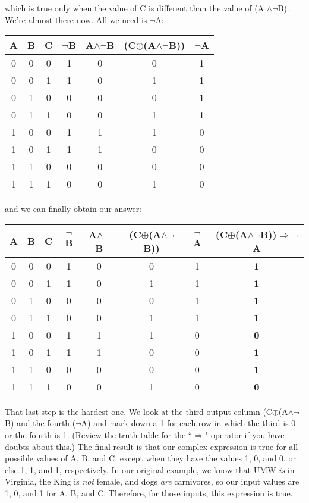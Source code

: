 which is true only when the value of C is different than the value of (A
$\wedge \neg$B). We're almost there now. All we need is $\neg$A:
\begin{nobreak}
\begin{center}
\begin{tabular}{c c c|c c c c}
A & B & C & $\neg$B & A$\wedge \neg$B & (C$\oplus$(A$\wedge \neg$B)) &
$\neg$A \\
\hline
0 & 0 & 0 & 1 & 0 & 0 & 1 \\
0 & 0 & 1 & 1 & 0 & 1 & 1 \\
0 & 1 & 0 & 0 & 0 & 0 & 1 \\
0 & 1 & 1 & 0 & 0 & 1 & 1 \\
1 & 0 & 0 & 1 & 1 & 1 & 0 \\
1 & 0 & 1 & 1 & 1 & 0 & 0 \\
1 & 1 & 0 & 0 & 0 & 0 & 0 \\
1 & 1 & 1 & 0 & 0 & 1 & 0 \\
\end{tabular}
\end{center}
\end{nobreak}
and we can finally obtain our answer:
\footnotesize
\begin{nobreak}
\begin{center}
\begin{tabular}{c c c|c c c c c}
A & B & C & $\neg$B & A$\wedge \neg$B & (C$\oplus$(A$\wedge \neg$B)) & $\neg$A & (C$\oplus$(A$\wedge \neg$B))$\Rightarrow$$\neg$A \\
\hline
0 & 0 & 0 & 1 & 0 & 0 & 1 & \textbf{1} \\
0 & 0 & 1 & 1 & 0 & 1 & 1 & \textbf{1} \\
0 & 1 & 0 & 0 & 0 & 0 & 1 & \textbf{1} \\
0 & 1 & 1 & 0 & 0 & 1 & 1 & \textbf{1} \\
1 & 0 & 0 & 1 & 1 & 1 & 0 & \textbf{0} \\
1 & 0 & 1 & 1 & 1 & 0 & 0 & \textbf{1} \\
1 & 1 & 0 & 0 & 0 & 0 & 0 & \textbf{1} \\
1 & 1 & 1 & 0 & 0 & 1 & 0 & \textbf{0} \\
\end{tabular}
\end{center}
\end{nobreak}
\normalsize
{}
That last step is the hardest one. We look at the third output column
(C$\oplus$(A$\wedge \neg$B) and the fourth ($\neg$A) and mark down a 1 for
each row in which the third is 0 or the fourth is 1. (Review the truth
table for the ``$\Rightarrow$" operator if you have doubts about this.) The
final result is that our complex expression is true for all possible values
of A, B, and C, except when they have the values 1, 0, and 0, or else 1, 1,
and 1, respectively. In our original example, we know that UMW \textit{is}
in Virginia, the King is \textit{not} female, and dogs \textit{are}
carnivores, so our input values are 1, 0, and 1 for A, B, and C. Therefore,
for those inputs, this expression is true.


